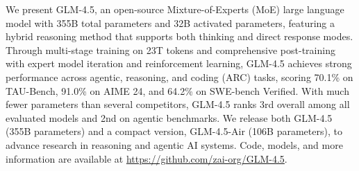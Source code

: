 \vspace{-0.5em}
We present GLM-4.5, an open-source Mixture-of-Experts (MoE) large language model with 355B total parameters and 32B activated parameters, featuring a hybrid reasoning method that supports both thinking and direct response modes. Through multi-stage training on 23T tokens and comprehensive post-training with expert model iteration and reinforcement learning, GLM-4.5 achieves strong performance across agentic, reasoning, and coding (ARC) tasks, scoring 70.1\% on TAU-Bench, 91.0\% on AIME 24, and 64.2\% on SWE-bench Verified. With much fewer parameters than several competitors, GLM-4.5 ranks 3rd overall among all evaluated models and 2nd on agentic benchmarks. We release both GLM-4.5 (355B parameters) and a compact version, GLM-4.5-Air (106B parameters), to advance research in reasoning and agentic AI systems. Code, models, and more information are available at \url{https://github.com/zai-org/GLM-4.5}.


     


